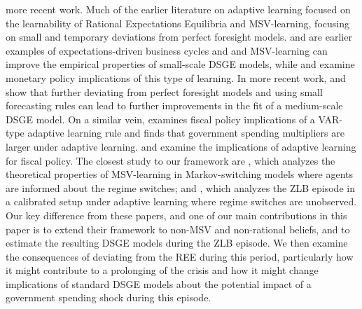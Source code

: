 \documentclass[12pt,reqno]{article}
\numberwithin{equation}{section}
\begin{document}
 more recent work. Much of the earlier literature on adaptive learning focused on the learnability of Rational Expectations Equilibria and MSV-learning, focusing on small and  temporary deviations from perfect foresight models. \cite{eusepi2011expectations} and \cite{milani2007expectations} are earlier examples of expectations-driven business cycles and and MSV-learning can improve the empirical properties of small-scale DSGE models, while \cite{bullard2002learning} and \cite{bullard2014does} examine monetary policy implications of this type of learning. In more recent work, \cite{slobodyan2012alearning}  and \cite{slobodyan2012blearning} show that further deviating from perfect foresight models and using small forecasting rules can lead to further improvements in the fit of a medium-scale DSGE model. On a similar vein, \cite{quaghebeur2018learning} examines fiscal policy implications of a VAR-type adaptive learning rule and finds that government spending multipliers are larger under adaptive learning. \cite{evans2008liquidity} and  \cite{evans201011} examine the implications of adaptive learning for fiscal policy. The closest study to our framework are \cite{branch2013adaptive}, which analyzes the theoretical properties of MSV-learning in Markov-switching models where agents are informed about the regime switches; and \cite{lansing2018endogenous}, which analyzes the ZLB episode in a calibrated setup under adaptive learning where regime switches are unobserved. 
Our key difference from these papers, and one of our main contributions in this paper is to extend their framework to non-MSV and non-rational beliefs, and to estimate the resulting DSGE models during the ZLB episode. We then examine the consequences of deviating from the REE during this period, particularly how it might contribute to a prolonging of the crisis and how it might change implications of standard DSGE models about the potential impact of a government spending shock during this episode. \\
\end{document}
